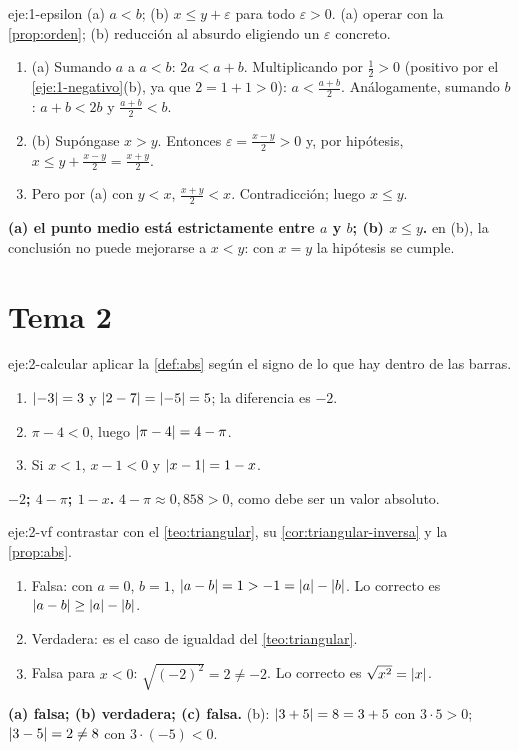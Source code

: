 \begin{solucion}{eje:1-epsilon}
\datos (a) $a<b$; (b) $x\le y+\varepsilon$ para todo $\varepsilon>0$.
\planteamiento (a) operar con la \cref{prop:orden}; (b) reducción al absurdo eligiendo un $\varepsilon$ concreto.
\pasos
\begin{enumerate}[label=\arabic*.]
  \item (a) Sumando $a$ a $a<b$: $2a<a+b$. Multiplicando por $\frac12>0$ (positivo por el \cref{eje:1-negativo}(b), ya que $2=1+1>0$): $a<\frac{a+b}2$. Análogamente, sumando $b$: $a+b<2b$ y $\frac{a+b}2<b$.
  \item (b) Supóngase $x>y$. Entonces $\varepsilon=\frac{x-y}2>0$ y, por hipótesis, $x\le y+\frac{x-y}2=\frac{x+y}2$.
  \item Pero por (a) con $y<x$, $\frac{x+y}2<x$. Contradicción; luego $x\le y$.
\end{enumerate}
\resultado \textbf{(a) el punto medio está estrictamente entre $a$ y $b$; (b) $x\le y$.}
\comprobacion en (b), la conclusión no puede mejorarse a $x<y$: con $x=y$ la hipótesis se cumple.
\end{solucion}
\section{Tema 2}

\begin{solucion}{eje:2-calcular}
\planteamiento aplicar la \cref{def:abs} según el signo de lo que hay dentro de las barras.
\pasos
\begin{enumerate}[label=\arabic*.]
  \item $\lvert-3\rvert=3$ y $\lvert2-7\rvert=\lvert-5\rvert=5$; la diferencia es $-2$.
  \item $\pi-4<0$, luego $\lvert\pi-4\rvert=4-\pi$.
  \item Si $x<1$, $x-1<0$ y $\lvert x-1\rvert=1-x$.
\end{enumerate}
\resultado \textbf{$-2$; $4-\pi$; $1-x$.}
\comprobacion $4-\pi\approx0{,}858>0$, como debe ser un valor absoluto.
\end{solucion}

\begin{solucion}{eje:2-vf}
\planteamiento contrastar con el \cref{teo:triangular}, su \cref{cor:triangular-inversa} y la \cref{prop:abs}.
\pasos
\begin{enumerate}[label=(\alph*)]
  \item Falsa: con $a=0$, $b=1$, $\lvert a-b\rvert=1>-1=\lvert a\rvert-\lvert b\rvert$. Lo correcto es $\lvert a-b\rvert\ge\lvert a\rvert-\lvert b\rvert$.
  \item Verdadera: es el caso de igualdad del \cref{teo:triangular}.
  \item Falsa para $x<0$: $\sqrt{(-2)^2}=2\neq-2$. Lo correcto es $\sqrt{x^2}=\lvert x\rvert$.
\end{enumerate}
\resultado \textbf{(a) falsa; (b) verdadera; (c) falsa.}
\comprobacion (b): $\lvert3+5\rvert=8=3+5$ con $3\cdot5>0$; $\lvert3-5\rvert=2\neq8$ con $3\cdot(-5)<0$.
\end{solucion}

